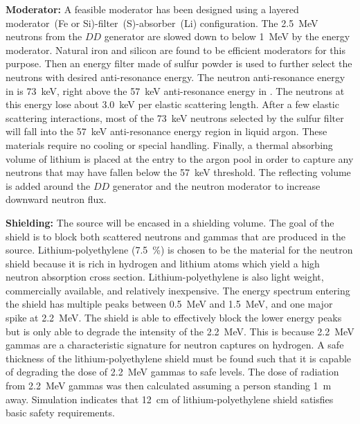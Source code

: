{\bf Moderator:}  A feasible moderator has been designed using a layered moderator~(Fe or Si)-filter~(S)-absorber~(Li) %
configuration. The \SI{2.5}{\MeV} neutrons from the $DD$ generator are slowed down to below \SI{1}{\MeV} by the energy moderator. Natural iron and silicon are found to be efficient moderators for this purpose. Then an energy filter made of sulfur powder is used to further select the neutrons with desired anti-resonance energy.
The neutron anti-resonance energy in  is \SI{73}{\keV}, right above the \SI{57}{\keV} anti-resonance energy in . The neutrons at this energy lose about \SI{3.0}{\keV} per elastic scattering length. After a few elastic scattering interactions, most of the \SI{73}{\keV} neutrons selected by the sulfur filter will fall into the \SI{57}{\keV} anti-resonance energy region in liquid argon. These materials require no cooling or special handling. Finally, a thermal absorbing volume of lithium is placed at the entry to the argon pool in order to capture any neutrons that may have fallen below the \SI{57}{\keV} threshold. The reflecting volume is added around the $DD$ generator and the neutron moderator to increase downward neutron flux. 

{\bf Shielding:} The source will be encased in a shielding volume. The goal of the shield is to block both scattered neutrons and gammas that are produced in the source. Lithium-polyethylene (\SI{7.5}{\%}) is chosen to be the material for the neutron shield because it is rich in hydrogen and lithium atoms which yield a high neutron absorption cross section. Lithium-polyethylene is also light weight, commercially available, and relatively inexpensive. The energy spectrum entering the shield has multiple peaks between \SI{0.5}{\MeV} and \SI{1.5}{\MeV}, and one major spike at \SI{2.2}{\MeV}. The shield is able to effectively block the lower energy peaks but is only able to degrade the intensity of the \SI{2.2}{\MeV}. This is because \SI{2.2}{\MeV} gammas are a characteristic signature for neutron captures on hydrogen. A safe thickness of the lithium-polyethylene shield must be found such that it is capable of degrading the dose of \SI{2.2}{\MeV} gammas to safe levels. The dose of radiation from \SI{2.2}{\MeV} gammas was then calculated assuming a person standing \SI{1}{\m} away. Simulation indicates that \SI{12}{\cm} of lithium-polyethylene shield satisfies basic safety requirements. 

